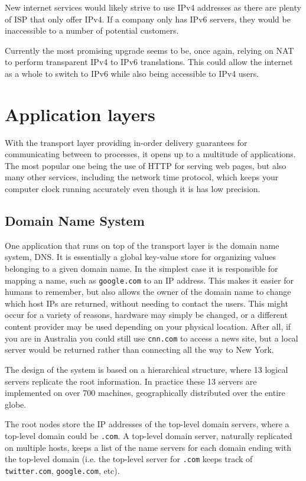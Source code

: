 New internet services would likely strive to use IPv4 addresses as there are plenty of ISP that only offer IPv4. If a company only has IPv6 servers, they would be inaccessible to a number of potential customers.

Currently the most promising upgrade seems to be, once again, relying on NAT to perform transparent IPv4 to IPv6 translations. This could allow the internet as a whole to switch to IPv6 while also being accessible to IPv4 users.

\section{Application layers}
With the transport layer providing in-order delivery guarantees for communicating between to processes, it opens up to a multitude of applications. The most popular one being the use of HTTP for serving web pages, but also many other services, including the network time protocol, which keeps your computer clock running accurately even though it is has low precision.

\subsection{Domain Name System}
One application that runs on top of the transport layer is the domain name system, DNS. It is essentially a global key-value store for organizing values belonging to a given domain name. In the simplest case it is responsible for mapping a name, such as \texttt{google.com} to an IP address. This makes it easier for humans to remember, but also allows the owner of the domain name to change which host IPs are returned, without needing to contact the users. This might occur for a variety of reasons, hardware may simply be changed, or a different content provider may be used depending on your physical location. After all, if you are in Australia you could still use \texttt{cnn.com} to access a news site, but a local server would be returned rather than connecting all the way to New York. 

The design of the system is based on a hierarchical structure, where 13 logical servers replicate the root information. In practice these 13 servers are implemented on over 700 machines, geographically distributed over the entire globe.

The root nodes store the IP addresses of the top-level domain servers, where a top-level domain could be \texttt{.com}. A top-level domain server, naturally replicated on multiple hosts, keeps a list of the name servers for each domain ending with the top-level domain (i.e. the top-level server for \texttt{.com} keeps track of \texttt{twitter.com}, \texttt{google.com}, etc).

